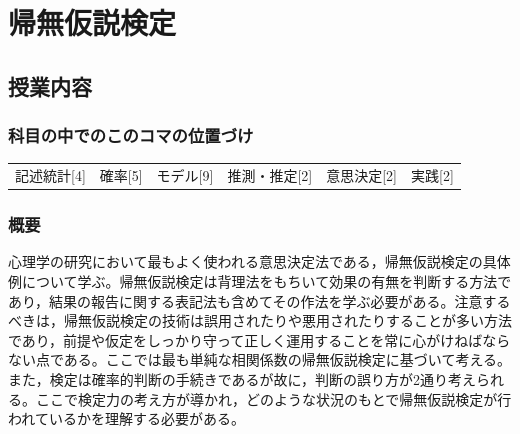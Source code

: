 \section{帰無仮説検定}
\label{D1_lesson18}
\subsection{授業内容}
\subsubsection{科目の中でのこのコマの位置づけ}
\begin{tabular}[t]{cccccc}
    記述統計[4] & 確率[5] & モデル[9] & 推測・推定[2] & 意思決定[2] & 実践[2]
\end{tabular}
\subsubsection{概要}
心理学の研究において最もよく使われる意思決定法である，帰無仮説検定の具体例について学ぶ。帰無仮説検定は背理法をもちいて効果の有無を判断する方法であり，結果の報告に関する表記法も含めてその作法を学ぶ必要がある。注意するべきは，帰無仮説検定の技術は誤用されたりや悪用されたりすることが多い方法であり，前提や仮定をしっかり守って正しく運用することを常に心がけねばならない点である。ここでは最も単純な相関係数の帰無仮説検定に基づいて考える。また，検定は確率的判断の手続きであるが故に，判断の誤り方が2通り考えられる。ここで検定力の考え方が導かれ，どのような状況のもとで帰無仮説検定が行われているかを理解する必要がある。
